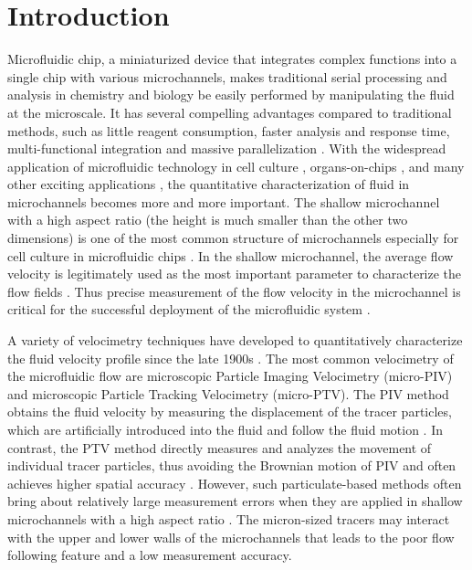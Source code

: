 \documentclass{article}
\begin{document}
\section{Introduction}
Microfluidic chip, a miniaturized device that integrates complex functions into a single chip with various microchannels, makes traditional serial processing and analysis in chemistry and biology be easily performed by manipulating the fluid at the microscale. It has several compelling advantages compared to traditional methods, such as little reagent consumption, faster analysis and response time, multi-functional integration and massive parallelization \citep{whitesides2006origins,stone2004engineering,nge2013advances}. With the widespread application of microfluidic technology in cell culture \citep{halldorsson2015advantages,sackmann2014present,shields2015microfluidic}, organs-on-chips \citep{esch2015organs,wu2020organ,wilmer2016kidney}, and many other exciting applications \citep{shang2017emerging,lam2005depthwise,doufene2019microfluidic}, the quantitative characterization of fluid in microchannels becomes more and more important. The shallow microchannel with a high aspect ratio (the height is much smaller than the other two dimensions) is one of the most common structure of microchannels especially for cell culture in microfluidic chips \citep{lane2012parallel,mehling2014microfluidic,van2009microfluidic}. In the shallow microchannel, the average flow velocity is legitimately used as the most important parameter to characterize the flow fields \citep{nauman1999quantitative,bacabac2005dynamic,wong2016parallel}. Thus precise measurement of the flow velocity in the microchannel is critical for the successful deployment of the microfluidic system \citep{yang2010manipulation,ong2008fundamental}.\par
A variety of velocimetry techniques have developed to quantitatively characterize the fluid velocity profile since the late 1900s \citep{sinton2004microscale,williams2010advances,wereley2010recent}. The most common velocimetry of the microfluidic flow are microscopic Particle Imaging Velocimetry (micro-PIV) and microscopic Particle Tracking Velocimetry (micro-PTV). The PIV method obtains the fluid velocity by measuring the displacement of the tracer particles, which are artificially introduced into the fluid and follow the fluid motion \citep{meinhart1999piv,lindken2009micro,westerweel2013particle}. In contrast, the PTV method directly measures and analyzes the movement of individual tracer particles, thus avoiding the Brownian motion of PIV and often achieves higher spatial accuracy \citep{adamczyk19882,kreizer2010real}. However, such particulate-based methods often bring about relatively large measurement errors when they are applied in shallow microchannels with a high aspect ratio \citep{wang2009measurement,williams2010advances}. The micron-sized tracers may interact with the upper and lower walls of the microchannels that leads to the poor flow following feature and a low measurement accuracy.\par
\end{document}
